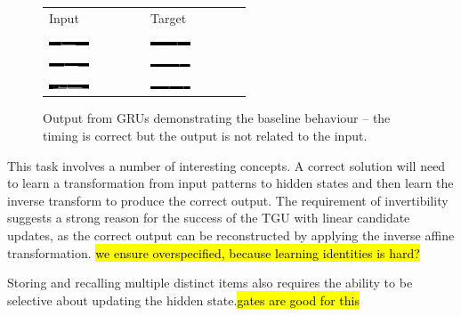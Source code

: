 \begin{figure}
\centering
	\begin{tabu} to \textwidth {XX}
		Input & Target \\
		\includegraphics[width=0.45\textwidth, interpolate=false]{exps/vbind/100x1gruinput} & 
		\includegraphics[width=0.45\textwidth, interpolate=false]{exps/vbind/100x1gruoutput} \\
		\includegraphics[width=0.45\textwidth, interpolate=false]{exps/vbind/100x2gruinput} & 
		\includegraphics[width=0.45\textwidth, interpolate=false]{exps/vbind/100x2gruoutput} \\
		\includegraphics[width=0.45\textwidth, interpolate=false]{exps/vbind/100x3gruinput} & 
		\includegraphics[width=0.45\textwidth, interpolate=false]{exps/vbind/100x3gruoutput} \\
	\end{tabu}
	\caption[Example of baseline for variable binding]{Output from GRUs demonstrating the baseline
	behaviour -- the timing is correct but the output is not related to the input.}
	\label{fig:vbindfail}
\end{figure}

This task involves a number of interesting concepts. A correct solution will need to learn a
transformation from input patterns to hidden states and then learn the inverse transform
to produce the correct output. The requirement of invertibility suggests a strong reason
for the success of the TGU with linear candidate updates, as the correct output can be reconstructed
by applying the inverse affine transformation. \hl{we ensure overspecified, because learning identities is hard?}

Storing and recalling multiple distinct items also requires the ability to be selective about
updating the hidden state.\hl{gates are good for this}

